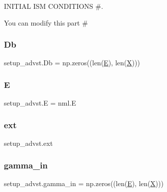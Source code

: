 I\+N\+I\+T\+I\+AL I\+SM C\+O\+N\+D\+I\+T\+I\+O\+NS \#. 

You can modify this part \# \mbox{\label{namespacesetup__advst_ab0d20b66bcec9e4b5cec60ec8203596b}} 
\subsubsection{\texorpdfstring{Db}{Db}}
{\footnotesize\ttfamily setup\+\_\+advst.\+Db = np.\+zeros((len(\hyperlink{namespacesetup__advst_a846b33b3abeae0f60876a6d51bb0ae79}{E}), len(\hyperlink{namespacesetup__advst_a4fe22219bfc7363b6decb33a0885e17a}{X})))}

\mbox{\label{namespacesetup__advst_a846b33b3abeae0f60876a6d51bb0ae79}} 
\subsubsection{\texorpdfstring{E}{E}}
{\footnotesize\ttfamily setup\+\_\+advst.\+E = nml.\+E}

\mbox{\label{namespacesetup__advst_a0df92a2ca2d62e842315a8f97ef341d0}} 
\subsubsection{\texorpdfstring{ext}{ext}}
{\footnotesize\ttfamily setup\+\_\+advst.\+ext}

\mbox{\label{namespacesetup__advst_ab37e9b74d0e75834d417093e7da00d1d}} 
\subsubsection{\texorpdfstring{gamma\+\_\+in}{gamma\_in}}
{\footnotesize\ttfamily setup\+\_\+advst.\+gamma\+\_\+in = np.\+zeros((len(\hyperlink{namespacesetup__advst_a846b33b3abeae0f60876a6d51bb0ae79}{E}), len(\hyperlink{namespacesetup__advst_a4fe22219bfc7363b6decb33a0885e17a}{X})))}

